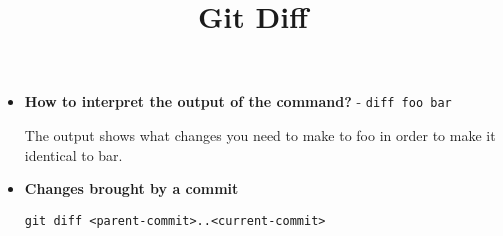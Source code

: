 \documentclass{../template/texnote}
\title{Git Diff}
\begin{document}
    \maketitle {}
	\begin{itemize}
		\item \textbf{How to interpret the output of the command?} - \verb|diff foo bar| 

The output shows what changes you need to make to foo in order to make it identical to bar.

\item \textbf{Changes brought by a commit}


\verb|git diff <parent-commit>..<current-commit>|
	\end{itemize}
    \printbibliography
\end{document}
